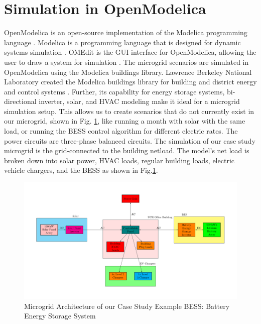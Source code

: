 \documentclass[conference]{IEEEtran}
\begin{document}
\section{Simulation in OpenModelica}
    	OpenModelica is an open-source implementation of the Modelica programming language \cite{OpenModelica}. Modelica is a programming language that is designed for dynamic systems simulation \cite{ModelicaLanguage}. OMEdit is the GUI interface for OpenModelica, allowing the user to draw a system for simulation \cite{OMEdit}. The microgrid scenarios are simulated in OpenModelica using the Modelica buildings library.  Lawrence Berkeley National Laboratory created the Modelica buildings library for building and district energy and control systems \cite{ModelicaBuildingsLibrary}. Further, its capability for energy storage systems, bi-directional inverter, solar, and HVAC modeling make it ideal for a microgrid simulation setup. This allows us to create scenarios that do not currently exist in our microgrid, shown in Fig. \ref{fig:powersystemsetupfull}, like running a month with solar with the same load, or running the BESS control algorithm for different electric rates.  The power circuits are three-phase balanced circuits. The simulation of our case study microgrid is the grid-connected to the building netload. The model's net load is broken down into solar power, HVAC loads, regular building loads, electric vehicle chargers, and the BESS as shown in Fig.\ref{fig:powersystemsetupfull}.
	\begin{figure}
		\centering
		\includegraphics[width=0.7\linewidth]{Fig/power_system_setup_modelica}
		\caption{\footnotesize Microgrid Architecture of our Case Study Example BESS: Battery Energy Storage System}
		\label{fig:powersystemsetupfull}
	\end{figure}
\end{document}
